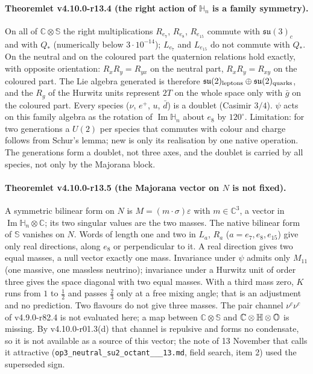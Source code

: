 \paragraph{Theoremlet v4.10.0-r13.4 (the right action of \(\mathbb H_n\) is a family symmetry).}
On all of \(\mathbb C\otimes\mathbb S\) the right multiplications \(R_{e_7}\), \(R_{e_8}\), \(R_{e_{15}}\) commute with
\(\mathfrak{su}(3)_c\) and with \(Q_*\) (numerically below \(3\cdot10^{-14}\)); \(L_{e_7}\) and \(L_{e_{15}}\) do not commute with
\(Q_*\).  On the neutral and on the coloured part the quaternion relations hold exactly, with opposite orientation:
\(R_xR_y=R_{yx}\) on the neutral part, \(R_xR_y=R_{xy}\) on the coloured part.  The Lie algebra generated is therefore
\(\mathfrak{su}(2)_{\rm leptons}\oplus\mathfrak{su}(2)_{\rm quarks}\), and the \(R_g\) of the Hurwitz units represent \(2T\) on the whole
space only with \(\bar g\) on the coloured part.  Every species (\(\nu\), \(e^+\), \(u\), \(\bar d\)) is a doublet (Casimir \(3/4\)).
\(\psi\) acts on this family algebra as the rotation of \(\operatorname{Im}\mathbb H_n\) about \(e_8\) by \(120^\circ\).
Limitation: for two generations a \(U(2)\) per species that commutes with colour and charge follows from Schur's lemma;
new is only its realisation by one native operation.  The generations form a doublet, not three axes, and the doublet is
carried by all species, not only by the Majorana block.

\paragraph{Theoremlet v4.10.0-r13.5 (the Majorana vector on \(N\) is not fixed).}
A symmetric bilinear form on \(N\) is \(M=(m\cdot\sigma)\varepsilon\) with \(m\in\mathbb C^3\), a vector in
\(\operatorname{Im}\mathbb H_n\otimes\mathbb C\); its two singular values are the two masses.  The native bilinear form of \(\mathbb S\)
vanishes on \(N\).  Words of length one and two in \(L_a\), \(R_a\) (\(a=e_7,e_8,e_{15}\)) give only real directions, along
\(e_8\) or perpendicular to it.  A real direction gives two equal masses, a null vector exactly one mass.  Invariance under
\(\psi\) admits only \(M_{11}\) (one massive, one massless neutrino); invariance under a Hurwitz unit of order three gives the
space diagonal with two equal masses.  With a third mass zero, \(K\) runs from \(1\) to \(\tfrac12\) and passes \(\tfrac23\) only
at a free mixing angle; that is an adjustment and no prediction.  Two flavours do not give three masses.  The pair channel
\(\nu^c\nu^c\) of v4.9.0-r82.4 is not evaluated here; a map between \(\mathbb C\otimes\mathbb S\) and
\(\mathbb C\otimes\mathbb H\otimes\mathbb{O}\) is missing.  By v4.10.0-r01.3(d) that channel is repulsive and forms no condensate, so it
is not available as a source of this vector; the note of 13 November that calls it attractive
(\texttt{op3\_\allowbreak neutral\_\allowbreak su2\_\allowbreak octant\_\_\_\allowbreak 13.md}, field search, item 2) used the superseded sign.

